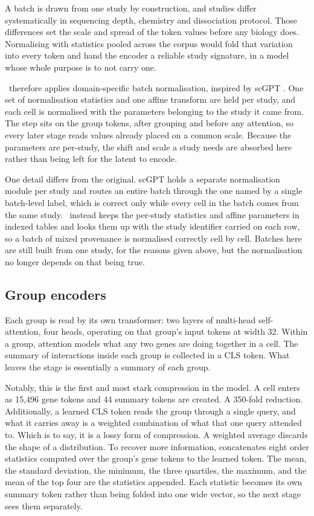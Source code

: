 A batch is drawn from one study by construction, and studies differ
systematically in sequencing depth, chemistry and dissociation protocol.
Those differences set the scale and spread of the token values before any
biology does. Normalising with statistics pooled across the corpus would
fold that variation into every token and hand the encoder a reliable study
signature, in a model whose whole purpose is to not carry one.

\elaj\ therefore applies domain-specific batch normalisation, inspired by
scGPT \citep{cui2024scgpt}. One set of normalisation statistics and one
affine transform are held per study, and each cell is normalised with the
parameters belonging to the study it came from. The step sits on the group
tokens, after grouping and before any attention, so every later stage reads
values already placed on a common scale. Because the parameters are
per-study, the shift and scale a study needs are absorbed here rather than
being left for the latent to encode.

One detail differs from the original. scGPT holds a separate normalisation
module per study and routes an entire batch through the one named by a
single batch-level label, which is correct only while every cell in the
batch comes from the same study. \elaj\ instead keeps the per-study
statistics and affine parameters in indexed tables and looks them up with
the study identifier carried on each row, so a batch of mixed provenance is
normalised correctly cell by cell. Batches here are still built from one
study, for the reasons given above, but the normalisation no longer depends
on that being true.

\subsection*{Group encoders}

Each group is read by its own transformer: two layers of multi-head
self-attention, four heads, operating on that group's input tokens at width
32. Within a group, attention models what any two genes are doing 
together in a cell. The summary of interactions inside each group is 
collected in a CLS token. What leaves the stage is essentially a summary of 
each group. 

Notably, this is the first and most stark compression in the model. A cell 
enters as 15{,}496 gene tokens and 44 summary tokens are created. A 350-fold 
reduction. Additionally, a learned CLS token reads the group through a single
query, and what it carries away is a weighted combination of what
that one query attended to. Which is to say, it is a lossy form of compression. A 
weighted average discards the shape of a distribution. To recover more 
information, \elaj{} concatenates eight order statistics computed over the 
group's gene tokens to the learned token. The mean, the standard deviation, 
the minimum, the three quartiles, the maximum, and the mean of the top four 
are the statistics appended. Each statistic becomes its own summary token 
rather than being folded into one wide vector, so the next stage sees them 
separately.


